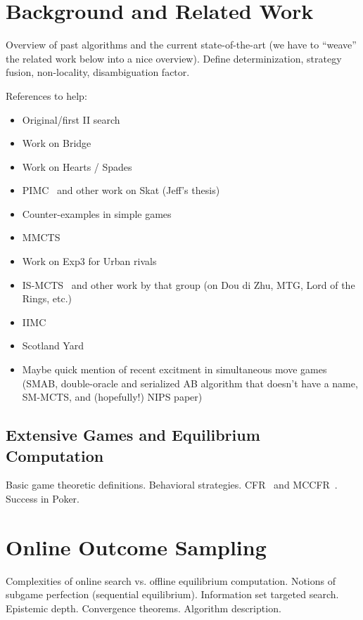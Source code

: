 \documentclass[letterpaper]{article}
\begin{document}
\section{Background and Related Work}

Overview of past algorithms and the current state-of-the-art (we have to ``weave'' the related work below into a nice overview).
Define determinization, strategy fusion, non-locality, disambiguation factor. 

References to help:
\begin{itemize}
\item Original/first II search~\cite{Frank98Finding}
\item Work on Bridge~\cite{Ginsberg01}
\item Work on Hearts / Spades~\cite{Sturtevant08An}
\item PIMC~\cite{long2010understanding} and other work on Skat (Jeff's thesis)
\item Counter-examples in simple games~\cite{Shafiei09,Ponsen11Computing} 
\item MMCTS~\cite{Auger11Multiple}
\item Work on Exp3 for Urban rivals~\cite{Teytaud11Upper,StPierre12Online}
\item IS-MCTS~\cite{Cowling12ISMCTS} and other work by that group (on Dou di Zhu, MTG, Lord of the Rings, etc.)
\item IIMC~\cite{Furtak13Recursive}
\item Scotland Yard~\cite{Nijssen12SY}
\item Maybe quick mention of recent excitment in simultaneous move games (SMAB, double-oracle and serialized AB algorithm that doesn't have a name, SM-MCTS, and (hopefully!) NIPS paper)
\end{itemize}

\subsection{Extensive Games and Equilibrium Computation}

Basic game theoretic definitions. Behavioral strategies. 
CFR~\cite{CFR} and MCCFR~\cite{Lanctot09Sampling}. Success in Poker.

\section{Online Outcome Sampling}

Complexities of online search vs. offline equilibrium computation. Notions of subgame perfection (sequential equilibrium). Information set targeted search. Epistemic depth.
Convergence theorems. Algorithm description.
\end{document}
